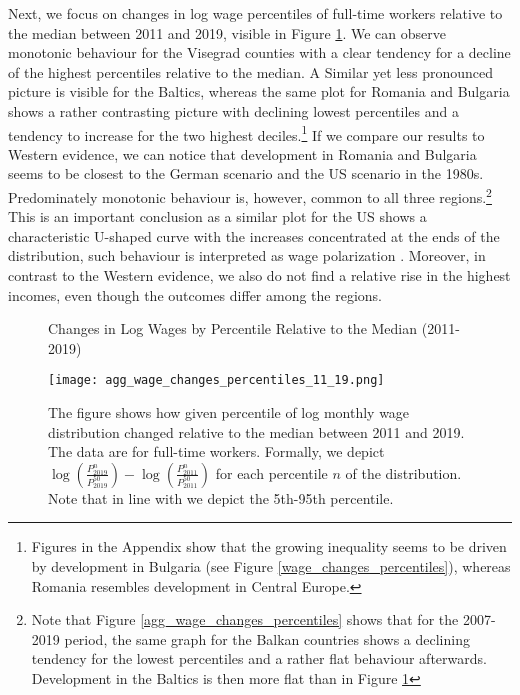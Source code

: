\documentclass[11pt]{article}
\begin{document}
Next, we focus on changes in log wage percentiles of full-time workers relative to the median between 2011 and 2019, visible in Figure \ref{agg_wage_changes_percentiles_11_19}. We can observe monotonic behaviour for the Visegrad counties with a clear tendency for a decline of the highest percentiles relative to the median. A Similar yet less pronounced picture is visible for the Baltics, whereas the same plot for Romania and Bulgaria shows a rather contrasting picture with declining lowest percentiles and a tendency to increase for the two highest deciles.\footnote{Figures in the Appendix show that the growing inequality seems to be driven by development in Bulgaria (see Figure \ref{wage_changes_percentiles}), whereas Romania resembles development in Central Europe.} If we compare our results to Western evidence, we can notice that development in Romania and Bulgaria seems to be closest to the German scenario and the US scenario in the 1980s. Predominately monotonic behaviour is, however, common to all three regions.\footnote{Note that Figure \ref{agg_wage_changes_percentiles} shows that for the 2007-2019 period, the same graph for the Balkan countries shows a declining tendency for the lowest percentiles and a rather flat behaviour afterwards. Development in the Baltics is then more flat than in Figure \ref{agg_wage_changes_percentiles_11_19}} This is an important conclusion as a similar plot for the US shows a characteristic U-shaped curve with the increases concentrated at the ends of the distribution, such behaviour is interpreted as wage polarization \citep{acemoglu2011skills}. Moreover, in contrast to the Western evidence, we also do not find a relative rise in the highest incomes, even though the outcomes differ among the regions.

\begin{figure}[!htbp]%
    \centering
    \caption{Changes in Log Wages by Percentile Relative to the Median (2011-2019)}
    {\texttt{[image: agg\_wage\_changes\_percentiles\_11\_19.png]} }
    \label{agg_wage_changes_percentiles_11_19}
    \caption*{\footnotesize The figure shows how given percentile of log monthly wage distribution changed relative to the median between 2011 and 2019. The data are for full-time workers. Formally, we depict $\log(\frac{P_{2019}^{n}}{P_{2019}^{50}}) - \log(\frac{P_{2011}^{n}}{P_{2011}^{50}})$ for each percentile $n$ of the distribution. Note that in line with \citet{acemoglu2011skills} we depict the 5th-95th percentile.} 
\end{figure}
\end{document}
